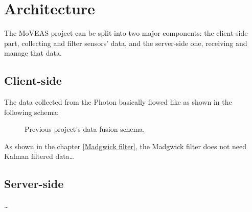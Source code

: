 \chapter{Architecture}
The MoVEAS project can be split into two major components: the client-side part, collecting and filter sensors' data, and the server-side one, receiving and manage that data.

\section{Client-side}
The data collected from the Photon basically flowed like as shown in the following schema:

\begin{center}
	\begin{figure}[ht!]
		\caption{Previous project's data fusion schema.} \label{old data fusion schema}
	\end{figure}
\end{center}
\bigbreak

As shown in the chapter \ref{Madgwick filter}, the Madgwick filter does not need Kalman filtered data\dots

\section{Server-side}
\dots
